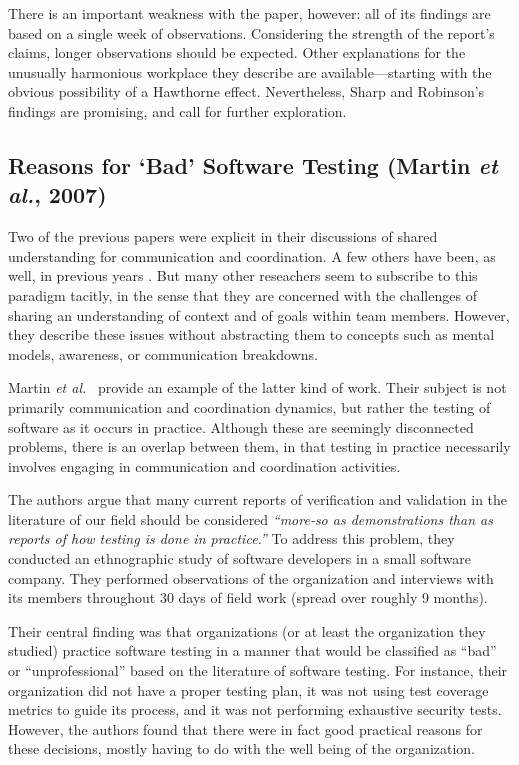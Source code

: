 There is an important weakness with the paper, however: all of its findings are based on a single week of observations. Considering the strength of the report's claims, longer observations should be expected. Other explanations for the unusually harmonious workplace they describe are available---starting with the obvious possibility of a Hawthorne effect. Nevertheless, Sharp and Robinson's findings are promising, and call for further exploration.


\subsection{Reasons for `Bad' Software Testing (Martin \emph{et al.}, 2007)}

Two of the previous papers were explicit in their discussions of shared understanding for communication and coordination. A few others have been, as well, in previous years \cite{Walz1993}. But many other reseachers seem to subscribe to this paradigm tacitly, in the sense that they are concerned with the challenges of sharing an understanding of context and of goals within team members. However, they describe these issues without abstracting them to concepts such as mental models, awareness, or communication breakdowns.

Martin \emph{et al.}\  provide an example of the latter kind of work. Their subject is not primarily communication and coordination dynamics, but rather the testing of software as it occurs in practice. Although these are seemingly disconnected problems, there is an overlap between them, in that testing in practice necessarily involves engaging in communication and coordination activities.

The authors argue that many current reports of verification and validation in the literature of our field should be considered \emph{``more-so as demonstrations than as reports of how testing is done in practice.''} To address this problem, they conducted an ethnographic study of software developers in a small software company. They performed observations of the organization and interviews with its members throughout 30 days of field work (spread over roughly 9 months). 

Their central finding was that organizations (or at least the organization they studied) practice software testing in a manner that would be classified as ``bad'' or ``unprofessional'' based on the literature of software testing. For instance, their organization did not have a proper testing plan, it was not using test coverage metrics to guide its process, and it was not performing exhaustive security tests. However, the authors found that there were in fact good practical reasons for these decisions, mostly having to do with the well being of the organization.

